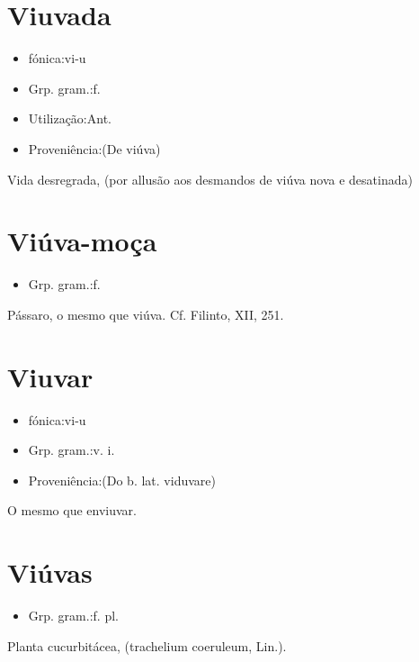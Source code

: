 \documentclass{article}
\begin{document}
\section{Viuvada}
\begin{itemize}
\item {fónica:vi-u}
\end{itemize}
\begin{itemize}
\item {Grp. gram.:f.}
\end{itemize}
\begin{itemize}
\item {Utilização:Ant.}
\end{itemize}
\begin{itemize}
\item {Proveniência:(De \textunderscore viúva\textunderscore )}
\end{itemize}
Vida desregrada, (por allusão aos desmandos de viúva nova e desatinada)
\section{Viúva-moça}
\begin{itemize}
\item {Grp. gram.:f.}
\end{itemize}
Pássaro, o mesmo que \textunderscore viúva\textunderscore . Cf. Filinto, XII, 251.
\section{Viuvar}
\begin{itemize}
\item {fónica:vi-u}
\end{itemize}
\begin{itemize}
\item {Grp. gram.:v. i.}
\end{itemize}
\begin{itemize}
\item {Proveniência:(Do b. lat. \textunderscore viduvare\textunderscore )}
\end{itemize}
O mesmo que \textunderscore enviuvar\textunderscore .
\section{Viúvas}
\begin{itemize}
\item {Grp. gram.:f. pl.}
\end{itemize}
Planta cucurbitácea, (\textunderscore trachelium coeruleum\textunderscore , Lin.).
\end{document}
